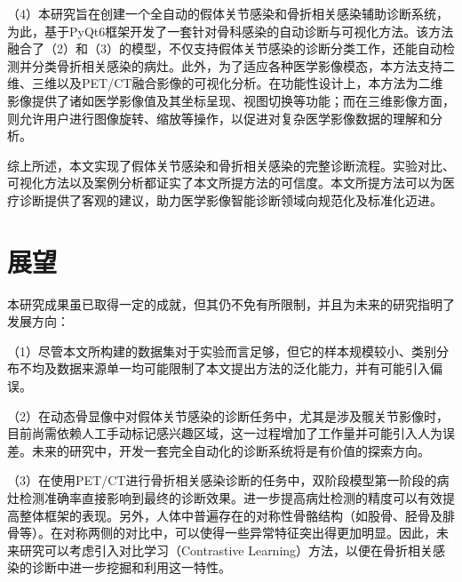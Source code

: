（4）本研究旨在创建一个全自动的假体关节感染和骨折相关感染辅助诊断系统，为此，基于PyQt6框架开发了一套针对骨科感染的自动诊断与可视化方法。该方法融合了（2）和（3）的模型，不仅支持假体关节感染的诊断分类工作，还能自动检测并分类骨折相关感染的病灶。此外，为了适应各种医学影像模态，本方法支持二维、三维以及PET/CT融合影像的可视化分析。在功能性设计上，本方法为二维影像提供了诸如医学影像值及其坐标呈现、视图切换等功能；而在三维影像方面，则允许用户进行图像旋转、缩放等操作，以促进对复杂医学影像数据的理解和分析。

综上所述，本文实现了假体关节感染和骨折相关感染的完整诊断流程。实验对比、可视化方法以及案例分析都证实了本文所提方法的可信度。本文所提方法可以为医疗诊断提供了客观的建议，助力医学影像智能诊断领域向规范化及标准化迈进。

\section{展望}

本研究成果虽已取得一定的成就，但其仍不免有所限制，并且为未来的研究指明了发展方向：

（1）尽管本文所构建的数据集对于实验而言足够，但它的样本规模较小、类别分布不均及数据来源单一均可能限制了本文提出方法的泛化能力，并有可能引入偏误。

（2）在动态骨显像中对假体关节感染的诊断任务中，尤其是涉及髋关节影像时，目前尚需依赖人工手动标记感兴趣区域，这一过程增加了工作量并可能引入人为误差。未来的研究中，开发一套完全自动化的诊断系统将是有价值的探索方向。

（3）在使用PET/CT进行骨折相关感染诊断的任务中，双阶段模型第一阶段的病灶检测准确率直接影响到最终的诊断效果。进一步提高病灶检测的精度可以有效提高整体框架的表现。另外，人体中普遍存在的对称性骨骼结构（如股骨、胫骨及腓骨等）。在对称两侧的对比中，可以使得一些异常特征突出得更加明显。因此，未来研究可以考虑引入对比学习（Contrastive Learning）方法，以便在骨折相关感染的诊断中进一步挖掘和利用这一特性。